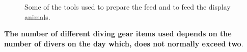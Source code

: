 \documentclass[
  letterpaper,
  DIV=11,
  numbers=noendperiod]{scrreprt}
\begin{document}
\begin{figure}[H]

\begin{minipage}[t]{0.33\linewidth}

{\centering 


}

\end{minipage}%
%
\begin{minipage}[t]{0.33\linewidth}

{\centering 


}

\end{minipage}%
%
\begin{minipage}[t]{0.33\linewidth}

{\centering 


}

\end{minipage}%

\caption{\label{fig-feed-tools}Some of the tools used to prepare the
feed and to feed the display animals.}

\end{figure}

\textbf{The number of different diving gear items used depends on the
number of divers on the day which, does not normally exceed two}.
\end{document}
